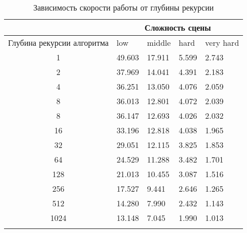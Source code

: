 \begin{center}
\begin{longtable}{|c|p{2cm}|p{2cm}|p{2cm}|p{2cm}|}
\hline & \multicolumn{4}{c|}{Сложность сцены} \\ 
\hline Глубина рекурсии алгоритма & low & middle & hard &  very hard\\ 
\hline 1 &  49.603 & 17.911 & 5.599 & 2.743 \\ 
\hline 2 &  37.969 & 14.041 & 4.391 & 2.183 \\ 
\hline 4 &  36.251 & 13.050 & 4.076 & 2.059 \\ 
\hline 8 &  36.013 & 12.801 & 4.072 & 2.039 \\ 
\hline 8 &  36.147 & 12.693 & 4.026 & 2.032 \\ 
\hline 16 &  33.196 & 12.818 & 4.038 & 1.965 \\ 
\hline 32 &  29.051 & 12.115 & 3.825 & 1.853 \\ 
\hline 64 &  24.529 & 11.288 & 3.482 & 1.701 \\ 
\hline 128 &  21.013 & 10.455 & 3.087 & 1.516 \\ 
\hline 256 &  17.527 & 9.441 & 2.646 & 1.265 \\ 
\hline 512 &  14.280 & 7.990 & 2.432 & 1.143 \\ 
\hline 1024 &  13.148 & 7.045 & 1.990 & 1.013 \\ 
\hline
\caption{Зависимость скорости работы от глубины рекурсии}\label{tab:performance_d}\end{longtable}
\end{center}

